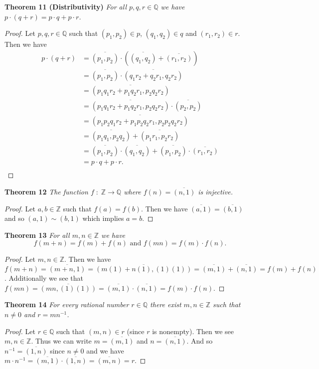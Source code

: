 \documentclass{article}
\begin{document}
\begin{flushleft}
\textbf{Theorem 11 (Distributivity)}
\textsl{For all $p,q,r \in \mathbb{Q}$ we have $p \cdot (q+r)=p \cdot q + p \cdot r$.}
\begin{proof}
Let $p,q,r \in \mathbb{Q}$ such that $(p_1,p_2) \in p$, $(q_1,q_2) \in q$ and $(r_1,r_2) \in r$. Then we have
\begin{align*}
p \cdot (q+r) &= \overline{(p_1,p_2)} \cdot \left(\overline{(q_1,q_2)} + \overline{(r_1,r_2)}\right) \\
			   &= \overline{(p_1,p_2)} \cdot \overline{(q_1r_2+q_2r_1,q_2r_2)}\\
			   &= \overline{(p_1q_1r_2+p_1q_2r_1,p_2q_2r_2)} \\
			   &= \overline{(p_1q_1r_2+p_1q_2r_1,p_2q_2r_2)} \cdot \overline{(p_2,p_2)} \\
			   &= \overline{(p_1p_2q_1r_2+p_1p_2q_2r_1,p_2p_2q_2r_2)} \\
			   &= \overline{(p_1q_1,p_2q_2)} + \overline{(p_1r_1,p_2r_2)} \\
			   &= \overline{(p_1,p_2)} \cdot \overline{(q_1,q_2)} + \overline{(p_1,p_2)} \cdot \overline{(r_1,r_2)} \\
			   &= p \cdot q + p \cdot r. \\
\end{align*}
\end{proof}

\textbf{Theorem 12}
\textsl{The function $f\; : \; \mathbb{Z} \rightarrow \mathbb{Q}$ where $f(n)=\overline{(n,1)}$ is injective.}
\begin{proof}
Let $a,b \in \mathbb{Z}$ such that $f(a)=f(b)$. Then we have $\overline{(a,1)}=\overline{(b,1)}$ and so $(a,1) \sim (b,1)$ which implies $a=b$.
\end{proof}

\textbf{Theorem 13}
\textsl{For all $m,n \in \mathbb{Z}$ we have
\[
f(m+n)=f(m)+f(n) \text{ and } f(mn)=f(m) \cdot f(n).
\]}
\begin{proof}
Let $m,n \in \mathbb{Z}$. Then we have $f(m+n)=\overline{(m+n,1)}=\overline{(m(1)+n(1),(1)(1))}=\overline{(m,1)}+\overline{(n,1)}=f(m)+f(n)$. Additionally we see that $f(mn)=\overline{(mn,(1)(1))}=\overline{(m,1)} \cdot \overline{(n,1)}=f(m) \cdot f(n)$.
\end{proof}

\textbf{Theorem 14}
\textsl{For every rational number $r \in \mathbb{Q}$ there exist $m,n \in \mathbb{Z}$ such that $n \neq 0$ and $r=mn^{-1}$.}
\begin{proof}
Let $r \in \mathbb{Q}$ such that $(m,n) \in r$ (since $r$ is nonempty). Then we see $m,n \in \mathbb{Z}$. Thus we can write $m=\overline{(m,1)}$ and $n=\overline{(n,1)}$. And so $n^{-1}=\overline{(1,n)}$ since $n \neq 0$ and we have $m \cdot n^{-1} = \overline{(m,1)} \cdot \overline{(1,n)} = \overline{(m,n)} = r$.
\end{proof}


\end{flushleft}
\end{document}
